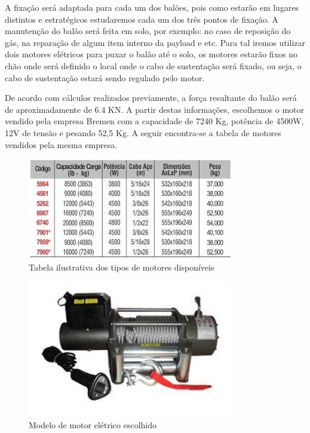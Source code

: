 A fixação será adaptada para cada um dos balões, pois como estarão em lugares distintos e estratégicos estudaremos cada um dos três pontos de fixação. A manutenção do balão será feita em solo, por exemplo: no caso de reposição do gás, na reparação de algum item interno da payload e etc. Para tal iremos utilizar dois motores elétricos para puxar o balão até o solo, os motores estarão fixos no chão onde será definido o local onde o cabo de sustentação será fixado, ou seja, o cabo de sustentação estará sendo regulado pelo motor.

De acordo com cálculos realizados previamente, a força resultante do balão será de aproximadamente de 6.4 KN. A partir destas informações, escolhemos o motor vendido pela empresa Bremen com a capacidade de 7240 Kg, potência de 4500W, 12V de tensão e pesando 52,5 Kg. A seguir encontra-se a tabela de motores vendidos pela mesma empresa.

\begin{figure}[H]
	\centering
	\includegraphics[width=0.8\textwidth]{figuras/tabelamotor}
	\caption[Tabela ilustrativa dos tipos de motores disponíveis]{Tabela ilustrativa dos tipos de motores disponíveis~\cite{bremem}}
	\label{img:tabelamotor}
\end{figure}

\begin{figure}[H]
	\centering
	\includegraphics[width=0.8\textwidth]{figuras/modelodemotoreletrico}
	\caption[Modelo de motor elétrico escolhido]{Modelo de motor elétrico escolhido~\cite{bremem}}
	\label{img:motorescolhido}
\end{figure}


